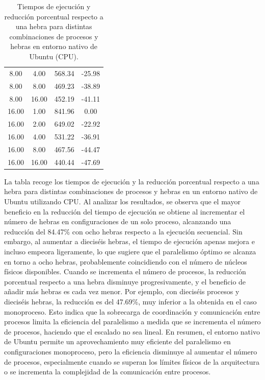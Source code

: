\begin{table}[ht]
\begin{tabular}{|c|c|c|c|}
        8.00              & 4.00            & 568.34              & -25.98                         \\
        8.00              & 8.00            & 469.23              & -38.89                         \\
        8.00              & 16.00           & 452.19              & -41.11                         \\
        16.00             & 1.00            & 841.96              & 0.00                           \\
        16.00             & 2.00            & 649.02              & -22.92                         \\
        16.00             & 4.00            & 531.22              & -36.91                         \\
        16.00             & 8.00            & 467.56              & -44.47                         \\
        16.00             & 16.00           & 440.44              & -47.69                         \\
        \hline
    \end{tabular}
    \caption{Tiempos de ejecución y reducción porcentual respecto a una hebra para distintas combinaciones de procesos y hebras en entorno nativo de Ubuntu (CPU).}
    \label{tab:thread_sweep_ubuntu_cpu_native}
\end{table}

La tabla recoge los tiempos de ejecución y la reducción porcentual respecto a una hebra para distintas combinaciones de procesos y hebras en un entorno nativo de Ubuntu utilizando CPU. Al analizar los resultados, se observa que el mayor beneficio en la reducción del tiempo de ejecución se obtiene al incrementar el número de hebras en configuraciones de un solo proceso, alcanzando una reducción del 84.47\% con ocho hebras respecto a la ejecución secuencial. Sin embargo, al aumentar a dieciséis hebras, el tiempo de ejecución apenas mejora e incluso empeora ligeramente, lo que sugiere que el paralelismo óptimo se alcanza en torno a ocho hebras, probablemente coincidiendo con el número de núcleos físicos disponibles. Cuando se incrementa el número de procesos, la reducción porcentual respecto a una hebra disminuye progresivamente, y el beneficio de añadir más hebras es cada vez menor. Por ejemplo, con dieciséis procesos y dieciséis hebras, la reducción es del 47.69\%, muy inferior a la obtenida en el caso monoproceso. Esto indica que la sobrecarga de coordinación y comunicación entre procesos limita la eficiencia del paralelismo a medida que se incrementa el número de procesos, haciendo que el escalado no sea lineal. En resumen, el entorno nativo de Ubuntu permite un aprovechamiento muy eficiente del paralelismo en configuraciones monoproceso, pero la eficiencia disminuye al aumentar el número de procesos, especialmente cuando se superan los límites físicos de la arquitectura o se incrementa la complejidad de la comunicación entre procesos.

